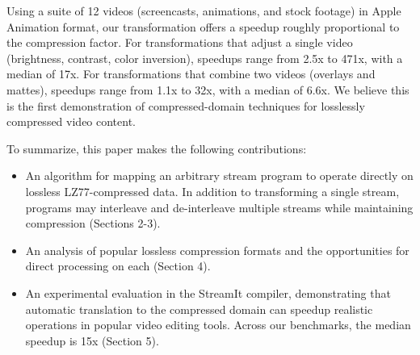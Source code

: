 Using a suite of 12 videos (screencasts, animations, and stock
footage) in Apple Animation format, our transformation offers a
speedup roughly proportional to the compression factor.  For
transformations that adjust a single video (brightness, contrast,
color inversion), speedups range from 2.5x to 471x, with a median of
17x.  For transformations that combine two videos (overlays and
mattes), speedups range from 1.1x to 32x, with a median of 6.6x.  We
believe this is the first demonstration of compressed-domain
techniques for losslessly compressed video content.



To summarize, this paper makes the following contributions:
\begin{itemize}

\item An algorithm for mapping an arbitrary stream program to operate
  directly on lossless LZ77-compressed data.  In addition to
  transforming a single stream, programs may interleave and
  de-interleave multiple streams while maintaining compression
  (Sections 2-3).

\item An analysis of popular lossless compression formats and the
  opportunities for direct processing on each (Section 4).

\item An experimental evaluation in the StreamIt compiler,
  demonstrating that automatic translation to the compressed domain
  can speedup realistic operations in popular video editing tools.
  Across our benchmarks, the median speedup is 15x (Section 5).

\end{itemize}

